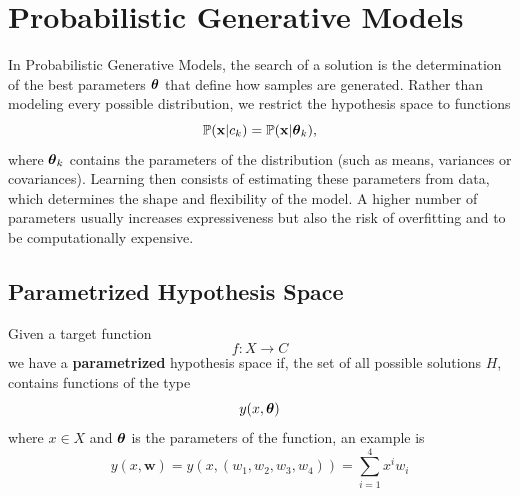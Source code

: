 \documentclass[10pt, letterpaper]{report}
\begin{document}
\section{Probabilistic Generative Models}
In Probabilistic Generative Models, the search of a solution is the determination of the best parameters ${\boldsymbol{\theta}}$ that define how samples are generated.
Rather than modeling every possible distribution, we restrict the hypothesis space to functions
\[
	{\mathbb P}(\mathbf x|c_k) = {\mathbb P}(\mathbf x|{\boldsymbol{\theta}}_k),
\]
where ${\boldsymbol{\theta}}_k$ contains the parameters of the distribution (such as means, variances or covariances).
\newline
Learning then consists of estimating these parameters from data, which determines the shape and flexibility of the model.
A higher number of parameters usually increases expressiveness but also the risk of overfitting and to be computationally expensive.

\bigskip
\subsection{Parametrized Hypothesis Space}
Given a target function
$$ f:X\rightarrow C $$
we have a \textbf{parametrized} hypothesis space if, the set of all possible solutions $H$, contains functions of the type
\begin{equation}
	y(x,{\boldsymbol{\theta}})
\end{equation}
where $x\in X$ and ${\boldsymbol{\theta}}$ is the parameters of the function, an example is\begin{equation}
	y(x,\mathbf w)=y(x,(w_1,w_2,w_3,w_4))=\sum_{i=1}^4x^iw_i
\end{equation}
\end{document}

